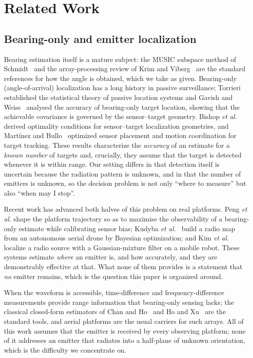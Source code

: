 \documentclass[journal,10pt]{IEEEtran}
\theoremstyle{definition}
\begin{document}
\section{Related Work}

\subsection{Bearing-only and emitter localization}
Bearing estimation itself is a mature subject: the MUSIC subspace method of
Schmidt~\cite{schmidt1986} and the array-processing review of Krim and
Viberg~\cite{krim1996} are the standard references for how the angle is obtained, which we take as
given. Bearing-only (angle-of-arrival) localization has a long history in passive surveillance;
Torrieri~\cite{torrieri1984} established the statistical theory of passive location systems and
Gavish and Weiss~\cite{gavish1992} analysed the accuracy of bearing-only target location, showing
that the achievable covariance is governed by the sensor--target geometry. Bishop
\emph{et al.}~\cite{bishop2010} derived optimality conditions for sensor--target localization
geometries, and Mart\'inez and Bullo~\cite{martinez2006} optimized sensor placement and motion
coordination for target tracking. These results characterize the \emph{accuracy} of an estimate
for a \emph{known number} of targets and, crucially, they assume that the target is detected
whenever it is within range. Our setting differs in that detection itself is uncertain because
the radiation pattern is unknown, and in that the number of emitters is unknown, so the decision
problem is not only ``where to measure'' but also ``when may I stop''.

Recent work has advanced both halves of this problem on real platforms. Peng \emph{et al.}
\cite{peng2024} shape the platform trajectory so as to maximise the observability of a
bearing-only estimate while calibrating sensor bias; Kudyba \emph{et al.}~\cite{kudyba2024}
build a radio map from an autonomous aerial drone by Bayesian optimization; and Kim
\emph{et al.}~\cite{kim2025} localize a radio source with a Gaussian-mixture filter on a
mobile robot. These systems estimate \emph{where} an emitter is, and how accurately, and they
are demonstrably effective at that. What none of them provides is a statement that \emph{no}
emitter remains, which is the question this paper is organized around.

When the waveform is accessible, time-difference and frequency-difference measurements provide
range information that bearing-only sensing lacks; the classical closed-form estimators of
Chan and Ho~\cite{chan1994} and Ho and Xu~\cite{ho2004} are the standard tools, and
aerial platforms are the usual carriers for such arrays. All of this work assumes that the
emitter is received by every observing platform; none of it addresses an emitter that radiates
into a half-plane of unknown orientation, which is the difficulty we concentrate on.
\end{document}
